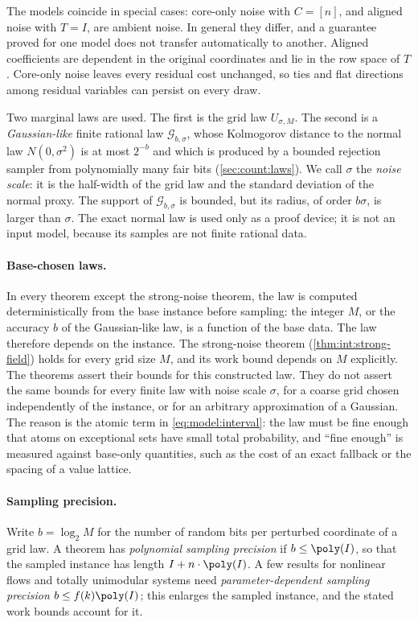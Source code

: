 The models coincide in special cases: core-only noise with $C=[n]$, and
aligned noise with $T=I$, are ambient noise. In general they differ, and a
guarantee proved for one model does not transfer automatically to another.
Aligned coefficients are dependent in the original coordinates and lie in
the row space of $T$. Core-only noise leaves every residual cost unchanged,
so ties and flat directions among residual variables can persist on every
draw.

Two marginal laws are used. The first is the grid law $U_{\sigma,M}$. The
second is a \emph{Gaussian-like} finite rational law $\mathcal G_{b,\sigma}$,
whose Kolmogorov distance to the normal law $N(0,\sigma^2)$ is at most
$2^{-b}$ and which is produced by a bounded rejection sampler from
polynomially many fair bits (\cref{sec:count:laws}). We call $\sigma$ the
\emph{noise scale}: it is the half-width of the grid law and the standard
deviation of the normal proxy. The support of $\mathcal G_{b,\sigma}$ is
bounded, but its radius, of order $b\sigma$, is larger than $\sigma$. The
exact normal law is used only as a proof device; it is not an input model,
because its samples are not finite rational data.

\paragraph{Base-chosen laws.}
In every theorem except the strong-noise theorem, the law is computed
deterministically from the base instance before sampling: the integer $M$,
or the accuracy $b$ of the Gaussian-like law, is a function of the base data.
The law therefore depends on the instance. The strong-noise theorem
(\cref{thm:int:strong-field}) holds for every grid size $M$, and its work
bound depends on $M$ explicitly. The theorems assert their bounds for this
constructed law. They do not assert the same bounds for every finite law
with noise scale $\sigma$, for a coarse grid chosen independently of the
instance, or for an arbitrary approximation of a Gaussian. The reason is the
atomic term in \eqref{eq:model:interval}: the law must be fine enough that
atoms on exceptional sets have small total probability, and ``fine enough''
is measured against base-only quantities, such as the cost of an exact
fallback or the spacing of a value lattice.

\paragraph{Sampling precision.}
Write $b=\log_2M$ for the number of random bits per perturbed coordinate of a
grid law. A theorem has \emph{polynomial sampling precision} if
$b\le\poly(I)$, so that the sampled instance has length
$I+n\cdot\poly(I)$. A few results for nonlinear flows and totally
unimodular systems need \emph{parameter-dependent sampling precision}
$b\le f(k)\poly(I)$; this enlarges the sampled instance, and the stated work
bounds account for it.

